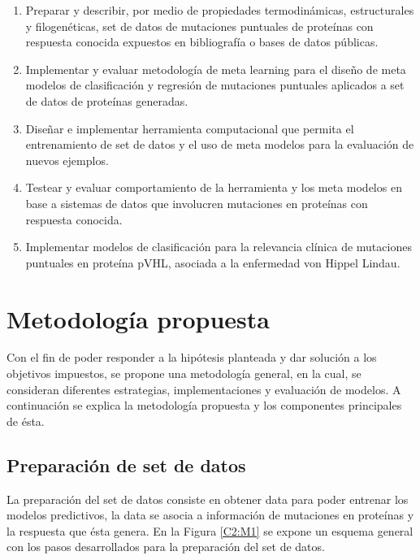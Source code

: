 \begin{enumerate}
	
	\item Preparar y describir, por medio de propiedades termodinámicas, estructurales y filogenéticas, set de datos de mutaciones puntuales de proteínas con respuesta conocida expuestos en bibliografía o bases de datos públicas.
	
	\item Implementar y evaluar metodología de meta learning para el diseño de meta modelos de clasificación y regresión de mutaciones puntuales aplicados a set de datos de proteínas generadas.
	
	\item Diseñar e implementar herramienta computacional que permita el entrenamiento de set de datos y el uso de meta modelos para la evaluación de nuevos ejemplos.
	
	\item Testear y evaluar comportamiento de la herramienta y los meta modelos en base a sistemas de datos que involucren mutaciones en proteínas con respuesta conocida.
	
	\item Implementar modelos de clasificación para la relevancia clínica de mutaciones puntuales en proteína pVHL, asociada a la enfermedad von Hippel Lindau. 
	
\end{enumerate}

\section{Metodología propuesta}

Con el fin de poder responder a la hipótesis planteada y dar solución a los objetivos impuestos, se propone una metodología general, en la cual, se consideran diferentes estrategias, implementaciones y evaluación de modelos. A continuación se explica la metodología propuesta y los componentes principales de ésta.

\subsection{Preparación de set de datos}

La preparación del set de datos consiste en obtener data para poder entrenar los modelos  predictivos, la data se asocia a información de mutaciones en proteínas y la respuesta que ésta genera. En la Figura \ref{C2:M1} se expone un esquema general con los pasos desarrollados para la preparación del set de datos.


